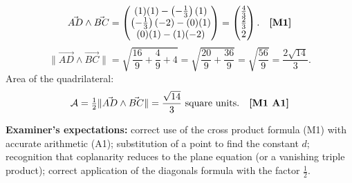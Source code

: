 \documentclass[11pt]{article}
\begin{document}
\begin{corrige}
\begin{enumerate}
\[
\vec{AD} \wedge \vec{BC} = \begin{pmatrix} (1)(1) - \left(-\frac{1}{3}\right)(1) \\ \left(-\frac{1}{3}\right)(-2) - (0)(1) \\ (0)(1) - (1)(-2) \end{pmatrix} = \begin{pmatrix} \frac{4}{3} \\ \frac{2}{3} \\ 2 \end{pmatrix}. \quad \text{\textbf{[M1]}}
\]
\[
\|\vec{AD} \wedge \vec{BC}\| = \sqrt{\frac{16}{9} + \frac{4}{9} + 4} = \sqrt{\frac{20}{9} + \frac{36}{9}} = \sqrt{\frac{56}{9}} = \frac{2\sqrt{14}}{3}.
\]
Area of the quadrilateral:
\[
\mathcal{A} = \tfrac{1}{2}\|\vec{AD} \wedge \vec{BC}\| = \frac{\sqrt{14}}{3} \text{ square units}. \quad \text{\textbf{[M1 A1]}}
\]
\end{enumerate}
\textbf{Examiner's expectations:} correct use of the cross product formula (M1) with accurate arithmetic (A1); substitution of a point to find the constant $d$; recognition that coplanarity reduces to the plane equation (or a vanishing triple product); correct application of the diagonals formula with the factor $\tfrac{1}{2}$.
\end{corrige}
\end{document}
